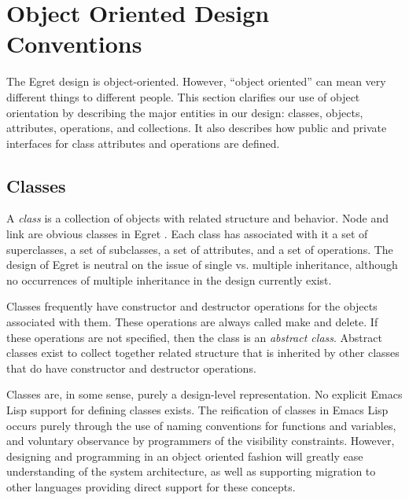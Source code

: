 \section{Object Oriented Design Conventions}

The Egret design is object-oriented.  However, ``object oriented'' can
mean very different things to different people.  This section
clarifies our use of object orientation by describing the major
entities in our design: classes, objects, attributes, operations, and
collections.  It also describes how public and private interfaces for
class attributes and operations are defined.


\subsection{Classes}  

A {\em class}\/ is a collection of objects with related structure and
behavior.  {\sf Node} and {\sf link} are obvious classes in Egret . Each class
has associated with it a set of superclasses, a set of subclasses, a set of
attributes, and a set of operations.  The design of Egret  is  neutral on the
issue of single vs.  multiple inheritance, although no occurrences of multiple
inheritance in the design currently exist.

Classes frequently have constructor and destructor operations for the
objects associated with them.  These operations are always called {\sf
make} and {\sf delete}. If these operations are not specified, then
the class is an {\em abstract class}. Abstract classes exist to
collect together related structure that is inherited by other classes
that do have constructor and destructor operations.

Classes are, in some sense, purely a design-level representation. No
explicit Emacs Lisp support for defining classes exists.  The
reification of classes in Emacs Lisp occurs purely through the use of
naming conventions for functions and variables, and voluntary
observance by programmers of the visibility constraints.  However,
designing and programming in an object oriented fashion will greatly
ease understanding of the system architecture, as well as supporting
migration to other languages providing direct support for these
concepts.

